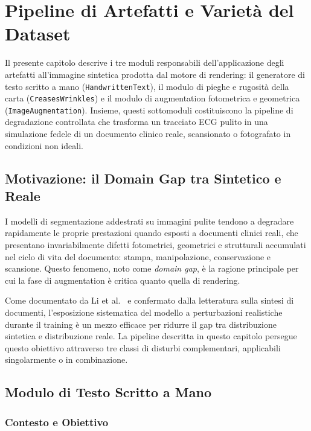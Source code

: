 \chapter{Pipeline di Artefatti e Varietà del Dataset}

Il presente capitolo descrive i tre moduli responsabili dell'applicazione degli artefatti all'immagine sintetica prodotta dal motore di rendering: il generatore di testo scritto a mano (\texttt{HandwrittenText}), il modulo di pieghe e rugosità della carta (\texttt{CreasesWrinkles}) e il modulo di augmentation fotometrica e geometrica (\texttt{ImageAugmentation}). Insieme, questi sottomoduli costituiscono la pipeline di degradazione controllata che trasforma un tracciato ECG pulito in una simulazione fedele di un documento clinico reale, scansionato o fotografato in condizioni non ideali.

\section{Motivazione: il Domain Gap tra Sintetico e Reale}

I modelli di segmentazione addestrati su immagini pulite tendono a degradare rapidamente le proprie prestazioni quando esposti a documenti clinici reali, che presentano invariabilmente difetti fotometrici, geometrici e strutturali accumulati nel ciclo di vita del documento: stampa, manipolazione, conservazione e scansione. Questo fenomeno, noto come \textit{domain gap}, è la ragione principale per cui la fase di augmentation è critica quanto quella di rendering.

Come documentato da Li et al.~\cite{li2020deep} e confermato dalla letteratura sulla sintesi di documenti, l'esposizione sistematica del modello a perturbazioni realistiche durante il training è un mezzo efficace per ridurre il gap tra distribuzione sintetica e distribuzione reale. La pipeline descritta in questo capitolo persegue questo obiettivo attraverso tre classi di disturbi complementari, applicabili singolarmente o in combinazione.

\section{Modulo di Testo Scritto a Mano}

\subsection{Contesto e Obiettivo}

